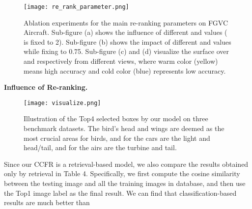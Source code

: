 \documentclass[10pt,twocolumn,letterpaper]{article}
\begin{document}
\begin{figure}[t]
\begin{center}
\texttt{[image: re\_rank\_parameter.png]}
\end{center}
   \caption{Ablation experiments for the main re-ranking parameters on FGVC Aircraft. Sub-figure (a) shows the influence of different  and  values ( is fixed to 2). Sub-figure (b) shows the impact of different  and  values while fixing  to 0.75.
   Sub-figure (c) and (d) visualize the surface over  and  respectively from different views, where warm color (yellow) means high accuracy and cold color (blue) represents low accuracy.
   }
\label{re_ranking_param}
\end{figure}


\textbf{Influence of Re-ranking.}\begin{figure*}[t]
\begin{center}
\texttt{[image: visualize.png]}
\end{center}
   \caption{Illustration of the Top4 selected boxes by our model on three benchmark datasets. The bird's head and wings are deemed as the most crucial areas for birds, and for the cars are the light and head/tail, and for the airs are the turbine and tail.}
\label{visualize}
\end{figure*}
Since our CCFR is a retrieval-based model, we also compare the results obtained only by retrieval in Table 4. Specifically, we first compute the cosine similarity between the testing image and all the training images in database, and then use the Top1 image label as the final result. We can find that classification-based results are much better than
\end{document}
